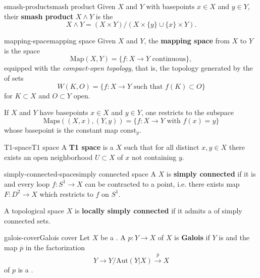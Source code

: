 \begin{topic}{smash-product}{smash product}
    Given  $X$ and $Y$ with basepoints $x \in X$ and $y \in Y$, their \textbf{smash product} $X \wedge Y$ is the 
    \[ X \wedge Y = (X \times Y) / (X \times \{ y \} \cup \{ x \} \times Y) . \]
\end{topic}

\begin{topic}{mapping-space}{mapping space}
    Given  $X$ and $Y$, the \textbf{mapping space} from $X$ to $Y$ is the space
    \[ \text{Map}(X, Y) = \{ f : X \to Y \text{ continuous} \} , \]
    equipped with the \textit{compact-open topology}, that is, the topology generated by the  of sets
    \[ W(K, O) = \{ f : X \to Y \text{ such that } f(K) \subset O \} \]
    for $K \subset X$  and $O \subset Y$ open.
    
    If $X$ and $Y$ have basepoints $x \in X$ and $y \in Y$, one restricts to the subspace
    \[ \text{Maps}((X, x), (Y, y)) = \{ f : X \to Y \text{ with } f(x) = y \} \]
    whose basepoint is the constant map $\text{const}_y$.
\end{topic}

\begin{topic}{T1-space}{T1 space}
    A \textbf{T1 space} is a  $X$ such that for all distinct $x, y \in X$ there exists an open neighborhood $U \subset X$ of $x$ not containing $y$.
\end{topic}

\begin{topic}{simply-connected-space}{simply connected space}
    A  $X$ is \textbf{simply connected} if it is  and every loop $f : S^1 \to X$ can be contracted to a point, i.e. there exists map $F : D^2 \to X$ which restricts to $f$ on $S^1$.
    
    A topological space $X$ is \textbf{locally simply connected} if it admits a  of simply connected sets.
\end{topic}

\begin{topic}{galois-cover}{Galois cover}
    Let $X$ be a . A  $p : Y \to X$ of $X$ is \textbf{Galois} if $Y$ is  and the map $\overline{p}$ in the factorization
    \[ Y \to Y / \text{Aut}(Y|X) \xrightarrow{\overline{p}} X \]
    of $p$ is a .
\end{topic}

